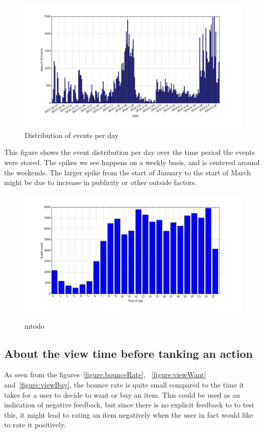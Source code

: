     \begin{figure}[H]
        \includegraphics[width=5in]{image/eventsPerDay.png}
        \centering
        \caption{Distribution of events per day}
    \label{figure:eventOnDaysDist}
    \end{figure}
        This figure shows the event distribution per day over the time period the events were stored.
        The spikes we see happens on a weekly basis, and is centered around the weekends.
        The larger spike from the start of January to the start of March might be due to increase in publicity or other outside factors.

    \begin{figure}[H]
        \includegraphics[width=5in]{image/hrdistribution.png}
        \centering
        \caption{mtodo}
    \label{figure:timeOfDayDistr}
    \end{figure}


\subsection{About the view time before tanking an action}
    As seen from the figures~\ref{figure:bounceRate}, ~\ref{figure:viewWant} and~\ref{figure:viewBuy}, the bounce rate is quite small compared to the time it takes for a user to decide to want or buy an item.
    This could be used as an indication of negative feedback, but since there is no explicit feedback to to test this, it might lead to rating an item negatively when the user in fact would like to rate it positively.


